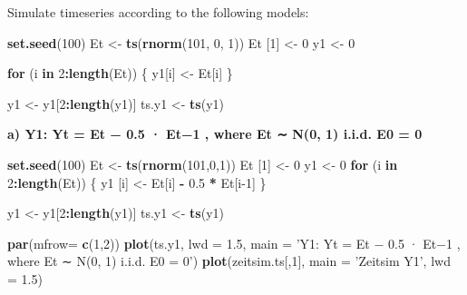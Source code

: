 \documentclass[
]{article}
\newenvironment{Shaded}{\begin{snugshade}}{\end{snugshade}}
\newcommand{\ControlFlowTok}[1]{\textcolor[rgb]{0.13,0.29,0.53}{\textbf{#1}}}
\newcommand{\DataTypeTok}[1]{\textcolor[rgb]{0.13,0.29,0.53}{#1}}
\newcommand{\DecValTok}[1]{\textcolor[rgb]{0.00,0.00,0.81}{#1}}
\newcommand{\FloatTok}[1]{\textcolor[rgb]{0.00,0.00,0.81}{#1}}
\newcommand{\KeywordTok}[1]{\textcolor[rgb]{0.13,0.29,0.53}{\textbf{#1}}}
\newcommand{\NormalTok}[1]{#1}
\newcommand{\OperatorTok}[1]{\textcolor[rgb]{0.81,0.36,0.00}{\textbf{#1}}}
\newcommand{\StringTok}[1]{\textcolor[rgb]{0.31,0.60,0.02}{#1}}
\begin{document}
Simulate timeseries according to the following models:

\begin{Shaded}
\begin{Highlighting}[]
\KeywordTok{set.seed}\NormalTok{(}\DecValTok{100}\NormalTok{)}
\NormalTok{Et <-}\StringTok{ }\KeywordTok{ts}\NormalTok{(}\KeywordTok{rnorm}\NormalTok{(}\DecValTok{101}\NormalTok{, }\DecValTok{0}\NormalTok{, }\DecValTok{1}\NormalTok{))}
\NormalTok{Et [}\DecValTok{1}\NormalTok{] <-}\StringTok{ }\DecValTok{0}
\NormalTok{y1 <-}\StringTok{ }\DecValTok{0}

\ControlFlowTok{for}\NormalTok{ (i }\ControlFlowTok{in} \DecValTok{2}\OperatorTok{:}\KeywordTok{length}\NormalTok{(Et)) \{}
\NormalTok{  y1[i] <-}\StringTok{ }\NormalTok{Et[i]}
\NormalTok{  \}}

\NormalTok{y1 <-}\StringTok{ }\NormalTok{y1[}\DecValTok{2}\OperatorTok{:}\KeywordTok{length}\NormalTok{(y1)]}
\NormalTok{ts.y1 <-}\StringTok{ }\KeywordTok{ts}\NormalTok{(y1)}
\end{Highlighting}
\end{Shaded}

\textbf{a) Y1: Yt = Et − 0.5 · Et−1 , where Et ∼ N(0, 1) i.i.d. E0 = 0}

\begin{Shaded}
\begin{Highlighting}[]
\KeywordTok{set.seed}\NormalTok{(}\DecValTok{100}\NormalTok{)}
\NormalTok{Et <-}\StringTok{ }\KeywordTok{ts}\NormalTok{(}\KeywordTok{rnorm}\NormalTok{(}\DecValTok{101}\NormalTok{,}\DecValTok{0}\NormalTok{,}\DecValTok{1}\NormalTok{))}
\NormalTok{Et [}\DecValTok{1}\NormalTok{] <-}\StringTok{ }\DecValTok{0}
\NormalTok{y1 <-}\StringTok{ }\DecValTok{0}
\ControlFlowTok{for}\NormalTok{ (i }\ControlFlowTok{in} \DecValTok{2}\OperatorTok{:}\KeywordTok{length}\NormalTok{(Et)) \{}
\NormalTok{  y1 [i] <-}\StringTok{ }\NormalTok{Et[i] }\OperatorTok{-}\StringTok{ }\FloatTok{0.5} \OperatorTok{*}\StringTok{ }\NormalTok{Et[i}\DecValTok{-1}\NormalTok{]}
\NormalTok{\}}

\NormalTok{y1 <-}\StringTok{ }\NormalTok{y1[}\DecValTok{2}\OperatorTok{:}\KeywordTok{length}\NormalTok{(y1)]}
\NormalTok{ts.y1 <-}\StringTok{ }\KeywordTok{ts}\NormalTok{(y1)}

\KeywordTok{par}\NormalTok{(}\DataTypeTok{mfrow=} \KeywordTok{c}\NormalTok{(}\DecValTok{1}\NormalTok{,}\DecValTok{2}\NormalTok{))}
\KeywordTok{plot}\NormalTok{(ts.y1, }\DataTypeTok{lwd =} \FloatTok{1.5}\NormalTok{, }\DataTypeTok{main =} \StringTok{'Y1: Yt = Et − 0.5 · Et−1 , where Et ∼ N(0, 1) i.i.d. E0 = 0'}\NormalTok{)}
\KeywordTok{plot}\NormalTok{(zeitsim.ts[,}\DecValTok{1}\NormalTok{], }\DataTypeTok{main =} \StringTok{'Zeitsim Y1'}\NormalTok{, }\DataTypeTok{lwd =} \FloatTok{1.5}\NormalTok{)}
\end{Highlighting}
\end{Shaded}
\end{document}
